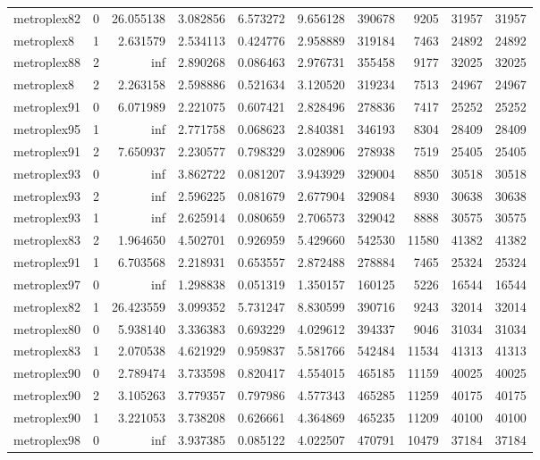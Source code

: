 \begin{longtable}{|l|r|r|r|r|r|r|r|r|r|}
metroplex82 & 0 & 26.055138 & 3.082856 & 6.573272 & 9.656128 & 390678 & 9205 & 31957 & 31957 \\
metroplex8 & 1 & 2.631579 & 2.534113 & 0.424776 & 2.958889 & 319184 & 7463 & 24892 & 24892 \\
metroplex88 & 2 & inf & 2.890268 & 0.086463 & 2.976731 & 355458 & 9177 & 32025 & 32025 \\
metroplex8 & 2 & 2.263158 & 2.598886 & 0.521634 & 3.120520 & 319234 & 7513 & 24967 & 24967 \\
metroplex91 & 0 & 6.071989 & 2.221075 & 0.607421 & 2.828496 & 278836 & 7417 & 25252 & 25252 \\
metroplex95 & 1 & inf & 2.771758 & 0.068623 & 2.840381 & 346193 & 8304 & 28409 & 28409 \\
metroplex91 & 2 & 7.650937 & 2.230577 & 0.798329 & 3.028906 & 278938 & 7519 & 25405 & 25405 \\
metroplex93 & 0 & inf & 3.862722 & 0.081207 & 3.943929 & 329004 & 8850 & 30518 & 30518 \\
metroplex93 & 2 & inf & 2.596225 & 0.081679 & 2.677904 & 329084 & 8930 & 30638 & 30638 \\
metroplex93 & 1 & inf & 2.625914 & 0.080659 & 2.706573 & 329042 & 8888 & 30575 & 30575 \\
metroplex83 & 2 & 1.964650 & 4.502701 & 0.926959 & 5.429660 & 542530 & 11580 & 41382 & 41382 \\
metroplex91 & 1 & 6.703568 & 2.218931 & 0.653557 & 2.872488 & 278884 & 7465 & 25324 & 25324 \\
metroplex97 & 0 & inf & 1.298838 & 0.051319 & 1.350157 & 160125 & 5226 & 16544 & 16544 \\
metroplex82 & 1 & 26.423559 & 3.099352 & 5.731247 & 8.830599 & 390716 & 9243 & 32014 & 32014 \\
metroplex80 & 0 & 5.938140 & 3.336383 & 0.693229 & 4.029612 & 394337 & 9046 & 31034 & 31034 \\
metroplex83 & 1 & 2.070538 & 4.621929 & 0.959837 & 5.581766 & 542484 & 11534 & 41313 & 41313 \\
metroplex90 & 0 & 2.789474 & 3.733598 & 0.820417 & 4.554015 & 465185 & 11159 & 40025 & 40025 \\
metroplex90 & 2 & 3.105263 & 3.779357 & 0.797986 & 4.577343 & 465285 & 11259 & 40175 & 40175 \\
metroplex90 & 1 & 3.221053 & 3.738208 & 0.626661 & 4.364869 & 465235 & 11209 & 40100 & 40100 \\
metroplex98 & 0 & inf & 3.937385 & 0.085122 & 4.022507 & 470791 & 10479 & 37184 & 37184 \\

\end{longtable}
